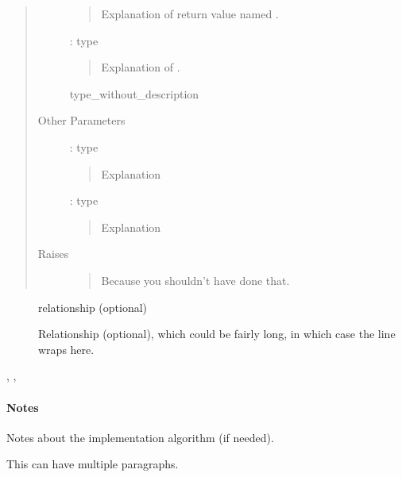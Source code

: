 \documentclass[letterpaper,10pt,english]{sphinxmanual}
\begin{document}
\begin{fulllineitems}
\begin{quote}
\begin{description}
\begin{quote}
Explanation of return value named .
\end{quote}

 : type
\begin{quote}

Explanation of .
\end{quote}

type\_without\_description

\item[{Other Parameters}] \leavevmode
{} : type
\begin{quote}

Explanation
\end{quote}

 : type
\begin{quote}

Explanation
\end{quote}

\item[{Raises}] \leavevmode
{}
\begin{quote}

Because you shouldn’t have done that.
\end{quote}

\end{description}\end{quote}



\begin{description}
\item[{}] \leavevmode
relationship (optional)

\item[{}] \leavevmode
Relationship (optional), which could be fairly long, in which case the line wraps here.

\end{description}

, , 


\paragraph{Notes}

Notes about the implementation algorithm (if needed).

This can have multiple paragraphs.


\end{fulllineitems}
\end{document}
